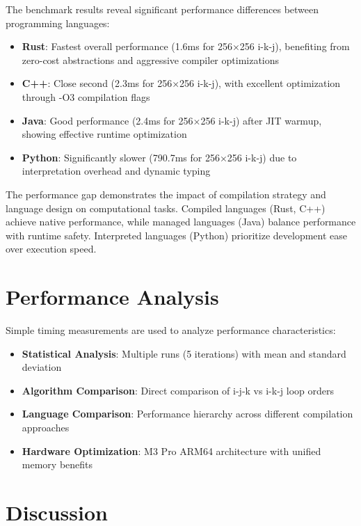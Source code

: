 \documentclass[11pt,a4paper]{article}
\begin{document}
The benchmark results reveal significant performance differences between programming languages:

\begin{itemize}
    \item \textbf{Rust}: Fastest overall performance (1.6ms for 256×256 i-k-j), benefiting from zero-cost abstractions and aggressive compiler optimizations
    \item \textbf{C++}: Close second (2.3ms for 256×256 i-k-j), with excellent optimization through -O3 compilation flags
    \item \textbf{Java}: Good performance (2.4ms for 256×256 i-k-j) after JIT warmup, showing effective runtime optimization
    \item \textbf{Python}: Significantly slower (790.7ms for 256×256 i-k-j) due to interpretation overhead and dynamic typing
\end{itemize}

The performance gap demonstrates the impact of compilation strategy and language design on computational tasks. Compiled languages (Rust, C++) achieve native performance, while managed languages (Java) balance performance with runtime safety. Interpreted languages (Python) prioritize development ease over execution speed.

\section{Performance Analysis}

Simple timing measurements are used to analyze performance characteristics:

\begin{itemize}
    \item \textbf{Statistical Analysis}: Multiple runs (5 iterations) with mean and standard deviation
    \item \textbf{Algorithm Comparison}: Direct comparison of i-j-k vs i-k-j loop orders
    \item \textbf{Language Comparison}: Performance hierarchy across different compilation approaches
    \item \textbf{Hardware Optimization}: M3 Pro ARM64 architecture with unified memory benefits
\end{itemize}

\section{Discussion}
\end{document}
